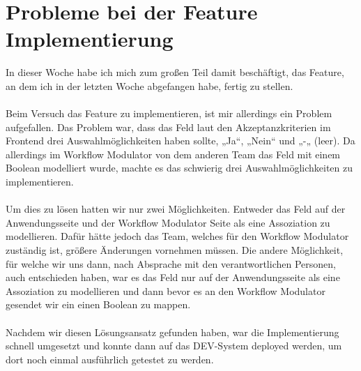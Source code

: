 \section{Probleme bei der Feature Implementierung}
In dieser Woche habe ich mich zum großen Teil damit beschäftigt, das Feature, an dem ich in der letzten Woche abgefangen habe, fertig zu stellen. \\\\
Beim Versuch das Feature zu implementieren, ist mir allerdings ein Problem aufgefallen. Das Problem war, dass das Feld laut den Akzeptanzkriterien im Frontend drei Auswahlmöglichkeiten haben sollte, „Ja“, „Nein“ und „-„ (leer). Da allerdings im Workflow Modulator von dem anderen Team das Feld mit einem Boolean modelliert wurde, machte es das schwierig drei Auswahlmöglichkeiten zu implementieren. \\\\
Um dies zu lösen hatten wir nur zwei Möglichkeiten. Entweder das Feld auf der Anwendungsseite und der Workflow Modulator Seite als eine Assoziation zu modellieren. Dafür hätte jedoch das Team, welches für den Workflow Modulator zuständig ist, größere Änderungen vornehmen müssen. Die andere Möglichkeit, für welche wir uns dann, nach Absprache mit den verantwortlichen Personen, auch entschieden haben, war es das Feld nur auf der Anwendungsseite als eine Assoziation zu modellieren und dann bevor es an den Workflow Modulator gesendet wir ein einen Boolean zu mappen. \\\\
Nachdem wir diesen Lösungsansatz gefunden haben, war die Implementierung schnell umgesetzt und konnte dann auf das DEV-System deployed werden, um dort noch einmal ausführlich getestet zu werden. \\\\

